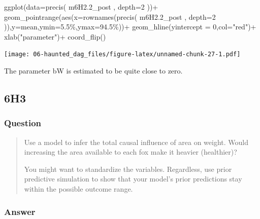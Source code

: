 \documentclass[
]{book}
\newenvironment{Shaded}{\begin{snugshade}}{\end{snugshade}}
\newcommand{\AttributeTok}[1]{\textcolor[rgb]{0.77,0.63,0.00}{#1}}
\newcommand{\DecValTok}[1]{\textcolor[rgb]{0.00,0.00,0.81}{#1}}
\newcommand{\FloatTok}[1]{\textcolor[rgb]{0.00,0.00,0.81}{#1}}
\newcommand{\FunctionTok}[1]{\textcolor[rgb]{0.00,0.00,0.00}{#1}}
\newcommand{\NormalTok}[1]{#1}
\newcommand{\SpecialCharTok}[1]{\textcolor[rgb]{0.00,0.00,0.00}{#1}}
\newcommand{\StringTok}[1]{\textcolor[rgb]{0.31,0.60,0.02}{#1}}
\begin{document}
\begin{Shaded}
\begin{Highlighting}[]
\FunctionTok{ggplot}\NormalTok{(}\AttributeTok{data=}\FunctionTok{precis}\NormalTok{( m6H2}\FloatTok{.2}\NormalTok{\_post , }\AttributeTok{depth=}\DecValTok{2}\NormalTok{ ))}\SpecialCharTok{+}
  \FunctionTok{geom\_pointrange}\NormalTok{(}\FunctionTok{aes}\NormalTok{(}\AttributeTok{x=}\FunctionTok{rownames}\NormalTok{(}\FunctionTok{precis}\NormalTok{( m6H2}\FloatTok{.2}\NormalTok{\_post , }\AttributeTok{depth=}\DecValTok{2}\NormalTok{ )),}\AttributeTok{y=}\NormalTok{mean,}\AttributeTok{ymin=}\StringTok{\textasciigrave{}}\AttributeTok{5.5\%}\StringTok{\textasciigrave{}}\NormalTok{,}\AttributeTok{ymax=}\StringTok{\textasciigrave{}}\AttributeTok{94.5\%}\StringTok{\textasciigrave{}}\NormalTok{))}\SpecialCharTok{+}
  \FunctionTok{geom\_hline}\NormalTok{(}\AttributeTok{yintercept =} \DecValTok{0}\NormalTok{,}\AttributeTok{col=}\StringTok{"red"}\NormalTok{)}\SpecialCharTok{+}
  \FunctionTok{xlab}\NormalTok{(}\StringTok{"parameter"}\NormalTok{)}\SpecialCharTok{+}
  \FunctionTok{coord\_flip}\NormalTok{()}
\end{Highlighting}
\end{Shaded}

\texttt{[image: 06-haunted\_dag\_files/figure-latex/unnamed-chunk-27-1.pdf]}

The parameter bW is estimated to be quite close to zero.

\hypertarget{h3-2}{%
\subsection*{6H3}\label{h3-2}}

\hypertarget{question-57}{%
\subsubsection*{Question}\label{question-57}}

\begin{quote}
Use a model to infer the total causal influence of area on weight. Would increasing the area available to each fox make it heavier (healthier)?

You might want to standardize the variables. Regardless, use prior predictive simulation to show that your model's prior predictions stay within the possible outcome range.
\end{quote}

\hypertarget{answer-57}{%
\subsubsection*{Answer}\label{answer-57}}
\end{document}

